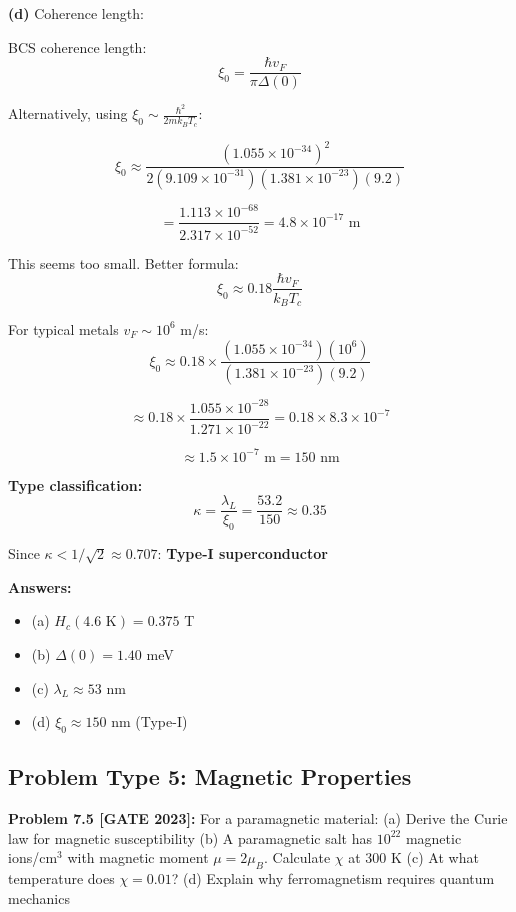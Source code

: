 \documentclass[12pt,a4paper]{article}
\begin{document}
\begin{solution}
\textbf{(d)} Coherence length:

BCS coherence length:
$$\xi_0 = \frac{\hbar v_F}{\pi \Delta(0)}$$

Alternatively, using $\xi_0 \sim \frac{\hbar^2}{2m k_B T_c}$:

$$\xi_0 \approx \frac{(1.055 \times 10^{-34})^2}{2(9.109 \times 10^{-31})(1.381 \times 10^{-23})(9.2)}$$

$$= \frac{1.113 \times 10^{-68}}{2.317 \times 10^{-52}} = 4.8 \times 10^{-17}\text{ m}$$

This seems too small. Better formula:
$$\xi_0 \approx 0.18 \frac{\hbar v_F}{k_B T_c}$$

For typical metals $v_F \sim 10^6$ m/s:
$$\xi_0 \approx 0.18 \times \frac{(1.055 \times 10^{-34})(10^6)}{(1.381 \times 10^{-23})(9.2)}$$

$$\approx 0.18 \times \frac{1.055 \times 10^{-28}}{1.271 \times 10^{-22}} = 0.18 \times 8.3 \times 10^{-7}$$

$$\approx 1.5 \times 10^{-7}\text{ m} = 150\text{ nm}$$

\textbf{Type classification:}
$$\kappa = \frac{\lambda_L}{\xi_0} = \frac{53.2}{150} \approx 0.35$$

Since $\kappa < 1/\sqrt{2} \approx 0.707$: \textbf{Type-I superconductor}

\textbf{Answers:}
\begin{itemize}
    \item (a) $H_c(4.6\text{ K}) = 0.375$ T
    \item (b) $\Delta(0) = 1.40$ meV
    \item (c) $\lambda_L \approx 53$ nm
    \item (d) $\xi_0 \approx 150$ nm (Type-I)
\end{itemize}
\end{solution}

\subsection{Problem Type 5: Magnetic Properties}

\textbf{Problem 7.5 [GATE 2023]:} For a paramagnetic material:
(a) Derive the Curie law for magnetic susceptibility
(b) A paramagnetic salt has $10^{22}$ magnetic ions/cm$^3$ with magnetic moment $\mu = 2\mu_B$. Calculate $\chi$ at 300 K
(c) At what temperature does $\chi = 0.01$?
(d) Explain why ferromagnetism requires quantum mechanics
\end{document}
